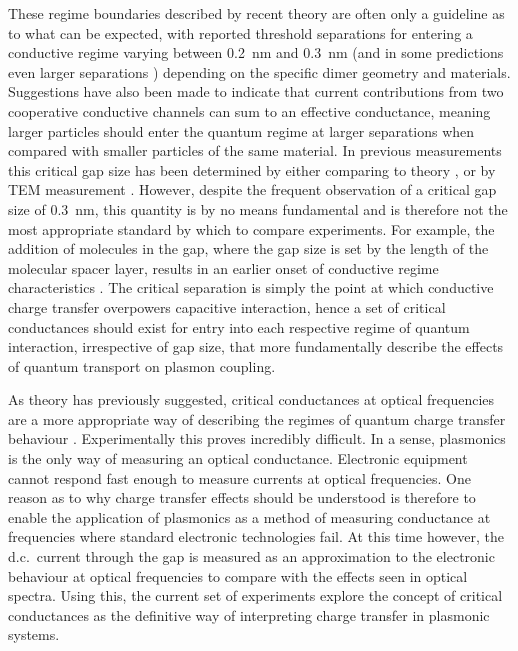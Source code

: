 \documentclass[a4paper, 11pt]{article}
\begin{document}
These regime boundaries described by recent theory are often only a guideline as to what can be expected, with reported threshold separations for entering a conductive regime varying between \SI{0.2}{nm} \cite{zuloaga2009} and \SI{0.3}{nm} \cite{esteban2012, savage2012, scholl2013, esteban2015} (and in some predictions even larger separations \cite{barbry2015}) depending on the specific dimer geometry and materials. Suggestions have also been made to indicate that current contributions from two cooperative conductive channels can sum to an effective conductance, meaning larger particles should enter the quantum regime at larger separations when compared with smaller particles of the same material. In previous measurements this critical gap size has been determined by either comparing to theory \cite{savage2012}, or by TEM measurement \cite{scholl2013}. However, despite the frequent observation of a critical gap size of \SI{0.3}{nm}, this quantity is by no means fundamental and is therefore not the most appropriate standard by which to compare experiments. For example, the addition of molecules in the gap, where the gap size is set by the length of the molecular spacer layer, results in an earlier onset of conductive regime characteristics \cite{tan2014, hajisalem2014}. The critical separation is simply the point at which conductive charge transfer overpowers capacitive interaction, hence a set of critical conductances should exist for entry into each respective regime of quantum interaction, irrespective of gap size, that more fundamentally describe the effects of quantum transport on plasmon coupling.

As theory has previously suggested, critical conductances at optical frequencies are a more appropriate way of describing the regimes of quantum charge transfer behaviour \cite{perez2011, benz2014}. Experimentally this proves incredibly difficult. In a sense, plasmonics is the only way of measuring an optical conductance. Electronic equipment cannot respond fast enough to measure currents at optical frequencies. One reason as to why charge transfer effects should be understood is therefore to enable the application of plasmonics as a method of measuring conductance at frequencies where standard electronic technologies fail. At this time however, the d.c.\ current through the gap is measured as an approximation to the electronic behaviour at optical frequencies to compare with the effects seen in optical spectra. Using this, the current set of experiments explore the concept of critical conductances as the definitive way of interpreting charge transfer in plasmonic systems.
\end{document}
